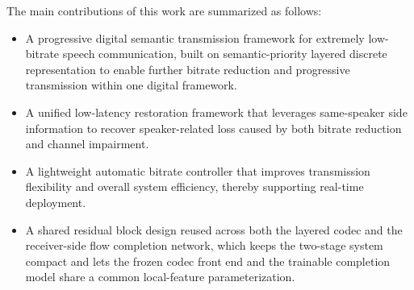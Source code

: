 \documentclass[conference]{IEEEtran}
\begin{document}
The main contributions of this work are summarized as follows:
\begin{itemize}
\item A progressive digital semantic transmission framework for extremely low-bitrate speech communication, built on semantic-priority layered discrete representation to enable further bitrate reduction and progressive transmission within one digital framework.
\item A unified low-latency restoration framework that leverages same-speaker side information to recover speaker-related loss caused by both bitrate reduction and channel impairment.
\item A lightweight automatic bitrate controller that improves transmission flexibility and overall system efficiency, thereby supporting real-time deployment.
\item A shared residual block design reused across both the layered codec and the receiver-side flow completion network, which keeps the two-stage system compact and lets the frozen codec front end and the trainable completion model share a common local-feature parameterization.
\end{itemize}
\end{document}
